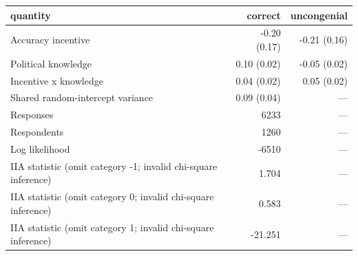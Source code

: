 \begin{tabular}{lrr}
\toprule
quantity & correct & uncongenial \\
\midrule
Accuracy incentive & -0.20 (0.17) & -0.21 (0.16) \\
Political knowledge & 0.10 (0.02) & -0.05 (0.02) \\
Incentive x knowledge & 0.04 (0.02) & 0.05 (0.02) \\
Shared random-intercept variance & 0.09 (0.04) & — \\
Responses & 6233 & — \\
Respondents & 1260 & — \\
Log likelihood & -6510 & — \\
IIA statistic (omit category -1; invalid chi-square inference) & 1.704 & — \\
IIA statistic (omit category 0; invalid chi-square inference) & 0.583 & — \\
IIA statistic (omit category 1; invalid chi-square inference) & -21.251 & — \\
\bottomrule
\end{tabular}
